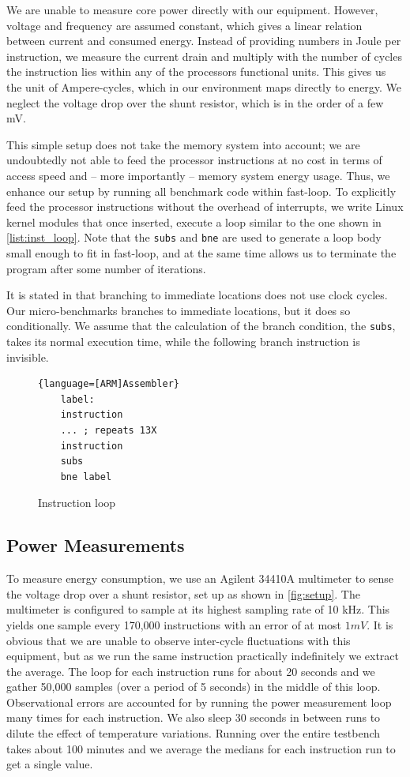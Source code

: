 We are unable to measure core power directly with our equipment. However,
voltage and frequency are assumed constant, which gives a linear relation
between current and consumed energy. Instead of providing numbers in Joule per
instruction, we measure the current drain and multiply with the number of cycles
the instruction lies within any of the processors functional units. This gives
us the unit of Ampere-cycles, which in our environment maps directly to energy.
We neglect the voltage drop over the shunt resistor, which is in the order of a
few mV.

This simple setup does not take the memory system into account; we are
undoubtedly not able to feed the processor instructions at no cost in terms of
access speed and -- more importantly -- memory system energy usage. Thus, we
enhance our setup by running all benchmark code within fast-loop. To explicitly
feed the processor instructions without the overhead of interrupts, we write
Linux kernel modules that once inserted, execute a loop similar to the one shown
in \autoref{list:inst_loop}. Note that the \texttt{subs} and \texttt{bne} are
used to generate a loop body small enough to fit in fast-loop, and at the same
time allows us to terminate the program after some number of iterations.

It is stated in \cite{armtech} that branching to immediate locations does not
use clock cycles. Our micro-benchmarks branches to immediate locations, but it
does so conditionally. We assume that the calculation of the branch condition,
the \texttt{subs}, takes its normal execution time, while the following branch
instruction is invisible.

\begin{figure}
    \begin{lstlisting}{language=[ARM]Assembler}
    label:
    instruction
    ... ; repeats 13X
    instruction
    subs
    bne label
    \end{lstlisting}
    \caption{Instruction loop}
    \label{list:inst_loop}
\end{figure}

\subsection{Power Measurements}
To measure energy consumption, we use an Agilent 34410A
multimeter\cite{agilent34410a} to sense the voltage drop over a shunt
resistor, set up as shown in \autoref{fig:setup}. The multimeter is
configured to sample at its highest sampling rate of 10 kHz. This yields one
sample every 170,000 instructions with an error of at most $1 mV$. It is
obvious that we are unable to observe inter-cycle fluctuations with this
equipment, but as we run the same instruction practically indefinitely we
extract the average. The loop for each instruction runs for about 20 seconds and
we gather 50,000 samples (over a period of 5 seconds) in the middle of this loop.
Observational errors are accounted for by running the power measurement loop
many times for each instruction. We also sleep 30 seconds in between runs to
dilute the effect of temperature variations. Running over the entire testbench
takes about 100 minutes and we average the medians for each instruction run to
get a single value.


